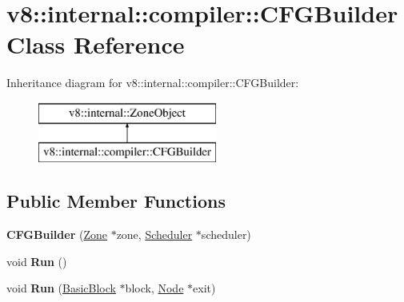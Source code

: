 \hypertarget{classv8_1_1internal_1_1compiler_1_1_c_f_g_builder}{}\section{v8\+:\+:internal\+:\+:compiler\+:\+:C\+F\+G\+Builder Class Reference}
\label{classv8_1_1internal_1_1compiler_1_1_c_f_g_builder}
Inheritance diagram for v8\+:\+:internal\+:\+:compiler\+:\+:C\+F\+G\+Builder\+:\begin{figure}[H]
\begin{center}
\leavevmode
\includegraphics[height=2.000000cm]{classv8_1_1internal_1_1compiler_1_1_c_f_g_builder}
\end{center}
\end{figure}
\subsection*{Public Member Functions}
\begin{DoxyCompactItemize}
\item 
{\bfseries C\+F\+G\+Builder} (\hyperlink{classv8_1_1internal_1_1_zone}{Zone} $\ast$zone, \hyperlink{classv8_1_1internal_1_1compiler_1_1_scheduler}{Scheduler} $\ast$scheduler)\hypertarget{classv8_1_1internal_1_1compiler_1_1_c_f_g_builder_a55aaa61346c562b0bc9e16d2181e7bb4}{}\label{classv8_1_1internal_1_1compiler_1_1_c_f_g_builder_a55aaa61346c562b0bc9e16d2181e7bb4}

\item 
void {\bfseries Run} ()\hypertarget{classv8_1_1internal_1_1compiler_1_1_c_f_g_builder_a059f288038f20f74a4fea7a359584e72}{}\label{classv8_1_1internal_1_1compiler_1_1_c_f_g_builder_a059f288038f20f74a4fea7a359584e72}

\item 
void {\bfseries Run} (\hyperlink{classv8_1_1internal_1_1compiler_1_1_basic_block}{Basic\+Block} $\ast$block, \hyperlink{classv8_1_1internal_1_1compiler_1_1_node}{Node} $\ast$exit)\hypertarget{classv8_1_1internal_1_1compiler_1_1_c_f_g_builder_a5886ce6f548528e88b24901f46ac63b3}{}\label{classv8_1_1internal_1_1compiler_1_1_c_f_g_builder_a5886ce6f548528e88b24901f46ac63b3}

\end{DoxyCompactItemize}
